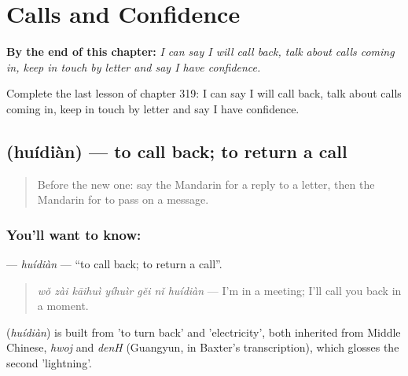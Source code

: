 
\chapter{Calls and Confidence}
\label{ch:zh-calls-and-confidence}

\begin{chapteropening}
\textbf{By the end of this chapter:} \emph{I can say I will call back, talk about calls coming in, keep in touch by letter and say I have confidence.}

Complete the last lesson of chapter 319: I can say I will call back, talk about calls coming in, keep in touch by letter and say I have confidence.
\end{chapteropening}

\section[\texorpdfstring{\zh{回电} (huídiàn)}{回电 (huídiàn)}]{ (huídiàn) — to call back; to return a call}

\label{lesson:ZH-C319-huidian}



\begin{quote}
Before the new one: say the Mandarin for a reply to a letter, then the Mandarin for to pass on a message.
\end{quote}

\subsection*{You'll want to know: }
\textbf{} — \emph{huídiàn} — \textquotedblleft{}to call back; to return a call\textquotedblright{}.

\begin{quote}
\textbf{} \emph{wǒ zài kāihuì yíhuìr gěi nǐ huídiàn} — I'm in a meeting; I'll call you back in a moment.
\end{quote}

\begin{cousinweb}
\textbf{} (\emph{huídiàn}) is built from  'to turn back' and  'electricity', both inherited from Middle Chinese, \emph{hwoj} and \emph{denH} (Guangyun, in Baxter's transcription), which glosses the second 'lightning'.
\end{cousinweb}

